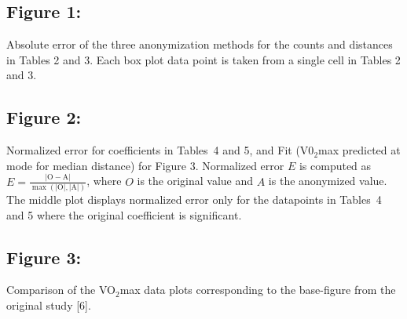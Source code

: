 \documentclass[10pt]{article}
\newcommand{\mycite}[1]{[#1]}
\begin{document}
\subsection*{Figure 1:}

Absolute error of the three anonymization methods for the counts and distances in Tables 2  and 3. Each box plot data point is taken from a single cell in Tables 2 and 3.


\subsection*{Figure 2:}

Normalized error for coefficients in Tables~4 and 5, and Fit (V0$_2$max predicted at mode for median distance) for Figure 3. Normalized error $E$ is computed as $E = \frac{\left| \text{O} - \text{A} \right|}{\max\left( \left| \text{O} \right|, \left| \text{A} \right| \right)}$, where $O$ is the original value and $A$ is the anonymized value. The middle plot displays normalized error only for the datapoints in Tables~4 and 5 where the original coefficient is significant.


\subsection*{Figure 3:}

Comparison of the VO$_2$max data plots corresponding to the base-figure from the original study \mycite{6}.

%
%
%
%
%
%
%
\end{document}
